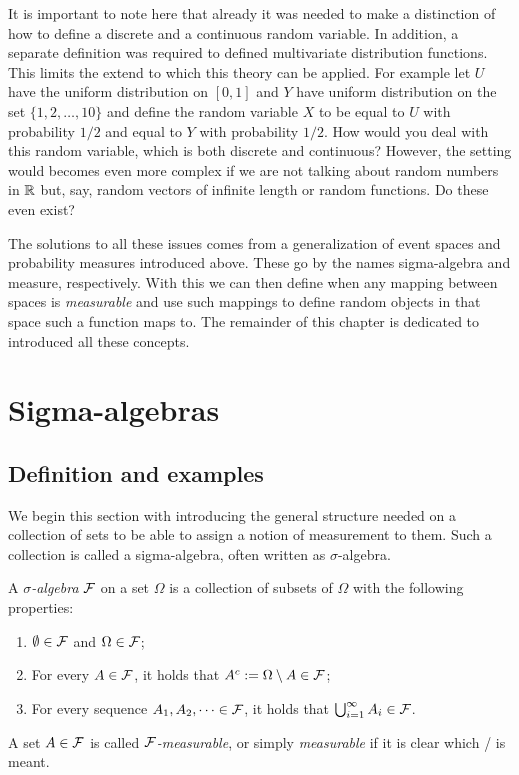 It is important to note here that already it was needed to make a distinction of how to define a discrete and a continuous random variable. In addition, a separate definition was required to defined multivariate distribution functions. This limits the extend to which this theory can be applied. For example let $U$ have the uniform distribution on $[0,1]$ and $Y$ have uniform distribution on the set $\{1,2, \dots, 10\}$ and define the random variable $X$ to be equal to $U$ with probability $1/2$ and equal to $Y$ with probability $1/2$. How would you deal with this random variable, which is both discrete and continuous? However, the setting would becomes even more complex if we are not talking about random numbers in $\mathbb R$ but, say, random vectors of infinite length or random functions. Do these even exist?

The solutions to all these issues comes from a generalization of event spaces and probability measures introduced above. These go by the names sigma-algebra and measure, respectively. With this we can then define when any mapping between spaces is \emph{measurable} and use such mappings to define random objects in that space such a function maps to. The remainder of this chapter is dedicated to introduced all these concepts.


\section{Sigma-algebras}


\subsection{Definition and examples}

We begin this section with introducing the general structure needed on a collection of sets to be able to assign a notion of measurement to them. Such a collection is called a sigma-algebra, often written as $\sigma$-algebra.

\begin{definition}\label{def:sigma_algebra}
A \emph{$\sigma$-algebra} $\mathcal F$ on a set $\Omega$ is a collection of subsets of $\Omega$ with the following properties:
\begin{enumerate}
\item $\emptyset \in \mathcal F$ and $\Omega \in \mathcal F$;
\item For every $A \in \mathcal F$, it holds that $A^c := \Omega \setminus A \in \mathcal F$;
\item For every sequence $A_1, A_2, \dots \in \mathcal F$, it holds that $\bigcup_{i = 1}^\infty A_i \in \mathcal F$.
\end{enumerate}
A set $A \in \mathcal F$ is called \emph{$\mathcal F$-measurable}, or simply \emph{measurable} if it is clear which \sigalg/ is meant.
\end{definition}

